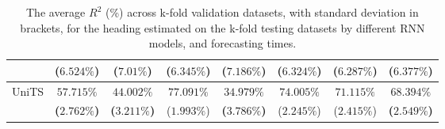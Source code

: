 \begin{table}[!ht]
{\begin{tabular}{|c|c|c|c|c|c|c|c|}
			 & ($6.524\%$) & ($7.01\%$) & ($6.345\%$) & ($7.186\%$) & ($6.324\%$) & ($6.287\%$) & ($6.377\%$) \\ \hline
			\multirow{2}{*}{UniTS} & $\mathbf{57.715\%}$ & $\mathbf{44.002\%}$ & $77.091\%$ & $\mathbf{34.979\%}$ & $74.005\%$ & $71.115\%$ & $\mathbf{68.394\%}$ \\
			 & \textbf{(}$\mathbf{2.762\%}$\textbf{)} & \textbf{(}$\mathbf{3.211\%}$\textbf{)} & ($1.993\%$) & \textbf{(}$\mathbf{3.786\%}$\textbf{)} & ($2.245\%$) & ($2.415\%$) & \textbf{(}$\mathbf{2.549\%}$\textbf{)} \\ \hline
		\end{tabular}
	}
	\caption{The average $R^{2}$ (\%) across k-fold validation datasets, with standard deviation in brackets, for the heading estimated on the k-fold testing datasets by different RNN models, and forecasting times.}
	\label{tab:all_direction_R2}
\end{table}

